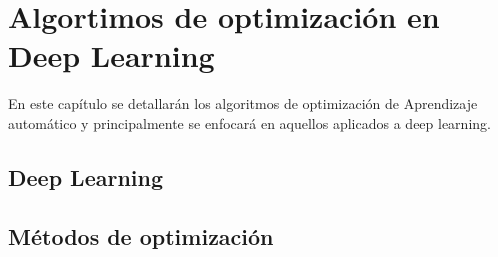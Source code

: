 \chapter{Algortimos de optimización en Deep Learning}
En este capítulo se detallarán los algoritmos de optimización de Aprendizaje automático y principalmente se enfocará en aquellos aplicados a deep learning.

\section{Deep Learning}

\section{Métodos de optimización}